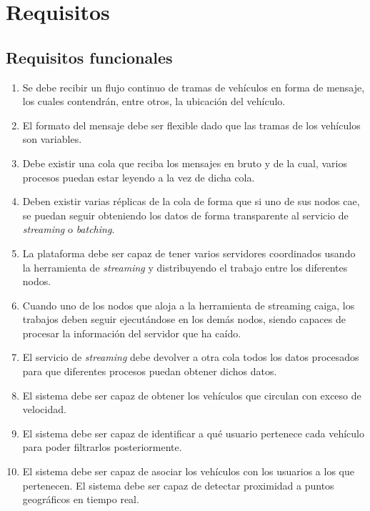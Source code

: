 
\chapter{Requisitos\label{requisitos}}

\section{Requisitos funcionales\label{RF}}

\begin{enumerate}
\item Se debe recibir un flujo continuo de tramas de vehículos en forma de
  mensaje, los cuales contendrán, entre otros, la ubicación del vehículo.
\item El formato del mensaje debe ser flexible dado que las tramas de los
  vehículos son variables.
\item Debe existir una cola que reciba los mensajes en bruto y de la cual,
  varios procesos puedan estar leyendo a la vez de dicha cola.
\item Deben existir varias réplicas de la cola de forma que si uno de sus
  nodos cae, se puedan seguir obteniendo los datos de forma transparente al
  servicio de {\em streaming} o {\em batching}.
\item La plataforma debe ser capaz de tener varios servidores coordinados
  usando la herramienta de {\em streaming} y distribuyendo el trabajo entre
  los diferentes nodos.
\item Cuando uno de los nodos que aloja a la herramienta de streaming
  caiga, los trabajos deben seguir ejecutándose en los demás nodos, siendo
  capaces de procesar la información del servidor que ha caído.
\item El servicio de {\em streaming} debe devolver a otra cola todos los
  datos procesados para que diferentes procesos puedan obtener dichos
  datos.
\item El sistema debe ser capaz de obtener los vehículos que circulan con
  exceso de velocidad.
\item El sistema debe ser capaz de identificar a qué usuario pertenece cada
  vehículo para poder filtrarlos posteriormente.
\item El sistema debe ser capaz de asociar los vehículos con los usuarios a
  los que pertenecen. El sistema debe ser capaz de detectar proximidad a
  puntos geográficos en tiempo real.
\end{enumerate}

